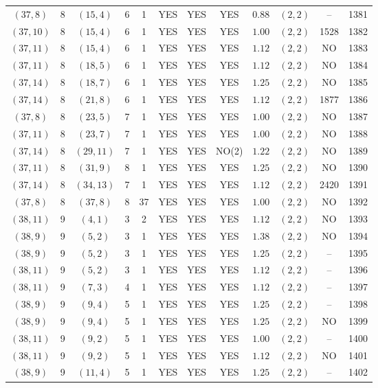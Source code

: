 \begin{longtable}{|c|c|c|c|c|c|c|c|c|c|c|c|}
$(37,8)$ & 8 & $(15,4)$ & 6 & 1 & YES & YES & YES & $0.88$ & $(2,2)$ & -- & 1381\\
$(37,10)$ & 8 & $(15,4)$ & 6 & 1 & YES & YES & YES & $1.00$ & $(2,2)$ & 1528 & 1382\\
$(37,11)$ & 8 & $(15,4)$ & 6 & 1 & YES & YES & YES & $1.12$ & $(2,2)$ & NO & 1383\\
$(37,11)$ & 8 & $(18,5)$ & 6 & 1 & YES & YES & YES & $1.12$ & $(2,2)$ & NO & 1384\\
$(37,14)$ & 8 & $(18,7)$ & 6 & 1 & YES & YES & YES & $1.25$ & $(2,2)$ & NO & 1385\\
$(37,14)$ & 8 & $(21,8)$ & 6 & 1 & YES & YES & YES & $1.12$ & $(2,2)$ & 1877 & 1386\\
$(37,8)$ & 8 & $(23,5)$ & 7 & 1 & YES & YES & YES & $1.00$ & $(2,2)$ & NO & 1387\\
$(37,11)$ & 8 & $(23,7)$ & 7 & 1 & YES & YES & YES & $1.00$ & $(2,2)$ & NO & 1388\\
$(37,14)$ & 8 & $(29,11)$ & 7 & 1 & YES & YES & NO(2) & $1.22$ & $(2,2)$ & NO & 1389\\
$(37,11)$ & 8 & $(31,9)$ & 8 & 1 & YES & YES & YES & $1.25$ & $(2,2)$ & NO & 1390\\
$(37,14)$ & 8 & $(34,13)$ & 7 & 1 & YES & YES & YES & $1.12$ & $(2,2)$ & 2420 & 1391\\
$(37,8)$ & 8 & $(37,8)$ & 8 & 37 & YES & YES & YES & $1.00$ & $(2,2)$ & NO & 1392\\
$(38,11)$ & 9 & $(4,1)$ & 3 & 2 & YES & YES & YES & $1.12$ & $(2,2)$ & NO & 1393\\
$(38,9)$ & 9 & $(5,2)$ & 3 & 1 & YES & YES & YES & $1.38$ & $(2,2)$ & NO & 1394\\
$(38,9)$ & 9 & $(5,2)$ & 3 & 1 & YES & YES & YES & $1.25$ & $(2,2)$ & -- & 1395\\
$(38,11)$ & 9 & $(5,2)$ & 3 & 1 & YES & YES & YES & $1.12$ & $(2,2)$ & -- & 1396\\
$(38,11)$ & 9 & $(7,3)$ & 4 & 1 & YES & YES & YES & $1.12$ & $(2,2)$ & -- & 1397\\
$(38,9)$ & 9 & $(9,4)$ & 5 & 1 & YES & YES & YES & $1.25$ & $(2,2)$ & -- & 1398\\
$(38,9)$ & 9 & $(9,4)$ & 5 & 1 & YES & YES & YES & $1.25$ & $(2,2)$ & NO & 1399\\
$(38,11)$ & 9 & $(9,2)$ & 5 & 1 & YES & YES & YES & $1.00$ & $(2,2)$ & -- & 1400\\
$(38,11)$ & 9 & $(9,2)$ & 5 & 1 & YES & YES & YES & $1.12$ & $(2,2)$ & NO & 1401\\
$(38,9)$ & 9 & $(11,4)$ & 5 & 1 & YES & YES & YES & $1.25$ & $(2,2)$ & -- & 1402\\

\end{longtable}
